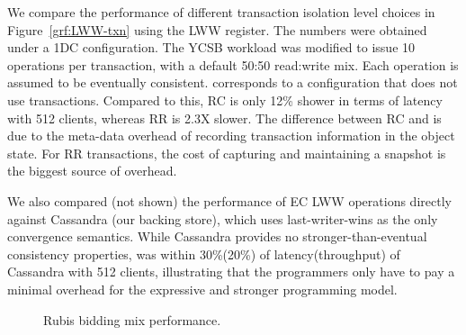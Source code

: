 We compare the performance of different transaction isolation level choices in
Figure~\ref{grf:LWW-txn} using the LWW register. The numbers were obtained
under a 1DC configuration. The YCSB workload was modified to issue 10
operations per transaction, with a default 50:50 read:write mix. Each operation
is assumed to be eventually consistent.  corresponds to a
configuration that does not use transactions. Compared to this, RC is only 12\%
shower in terms of latency with 512 clients, whereas RR is 2.3X slower. The
difference between RC and  is due to the meta-data overhead of
recording transaction information in the object state. For RR transactions, the
cost of capturing and maintaining a snapshot is the biggest source of overhead.

We also compared (not shown) the performance of EC LWW operations directly
against Cassandra (our backing store), which uses last-writer-wins as the only
convergence semantics. While Cassandra provides no stronger-than-eventual
consistency properties, \name was within 30\%(20\%) of latency(throughput) of
Cassandra with 512 clients, illustrating that the programmers only have to pay
a minimal overhead for the expressive and stronger \name programming model.

\begin{figure}
  \centering
	\caption{Rubis bidding mix performance.}
  \label{grf:rubis}
\end{figure}

